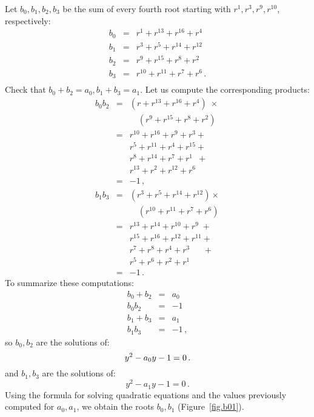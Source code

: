 \documentclass[11pt,a4paper]{article}
\newenvironment{form}[1]{%
\begin{displaymath}%
\renewcommand{\arraystretch}{#1}%
\begin{array}{lcl}}%
{\end{array}%
\end{displaymath}%
}
\begin{document}
Let $b_0,b_1,b_2,b_3$ be the sum of every fourth root starting with $r^1,r^3,r^9,r^{10}$, respectively:
\begin{form}{1.3}
b_0&=& r^1+ r^{13} + r^{16} + r^4\\
b_1&=& r^3+ r^{5} + r^{14} + r^{12}\\
b_2&=& r^9+ r^{15} + r^{8} + r^2\\
b_3&=& r^{10}+ r^{11} + r^{7} + r^6\,.\\
\end{form}
Check that $b_0+b_2=a_0, b_1+b_3=a_1$. Let us compute the corresponding products:
\begin{form}{1.3}
b_0b_2&=&(r + r^{13} + r^{16} +r^4)\;\times\\
&&\quad (r^9 + r^{15} + r^{8} +r^{2})\\
&=& r^{10}+r^{16}+r^9+r^3+\\
&& r^{5}+r^{11}+r^4+r^{15}+\\
&& r^{8}+r^{14}+r^7+r^1\;\:+\\
&& r^{13}+r^{2}+r^{12}+r^6\\
&=&-1\,,\\
b_1b_3&=&(r^3 + r^{5} + r^{14} +r^{12})\times\\
&&\quad (r^{10} + r^{11} + r^{7} +r^{6})\\
&=& r^{13}+r^{14}+r^{10}+r^9\;+\\
&& r^{15}+r^{16}+r^{12}+r^{11}+\\
&& r^{7}+r^{8}+r^4+r^3\quad\;\;+\\
&& r^{5}+r^{6}+r^{2}+r^1\\
&=&-1\,.
\end{form}
To summarize these computations:
\begin{form}{1.2}
b_0+b_2&=&a_0\\
b_0b_2&=&-1\\
b_1+b_3&=&a_1\\
b_1b_3&=&-1\,,
\end{form}
so $b_0,b_2$ are the solutions of:
\[
y^2-a_0y-1= 0\,.\\
\]
and $b_1,b_3$ are the solutions of:
\[
y^2-a_1y-1 =0\,.
\]
Using the formula for solving quadratic equations and the values previously computed for $a_0,a_1$, we obtain the roots $b_0,b_1$ (Figure~\ref{fig.b01}).
\end{document}
